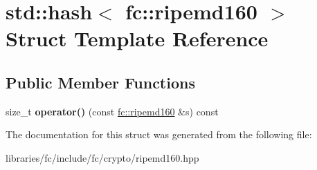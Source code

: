 \hypertarget{structstd_1_1hash_3_01fc_1_1ripemd160_01_4}{}\section{std\+:\+:hash$<$ fc\+:\+:ripemd160 $>$ Struct Template Reference}
\label{structstd_1_1hash_3_01fc_1_1ripemd160_01_4}
\subsection*{Public Member Functions}
\begin{DoxyCompactItemize}
\item 
\mbox{\label{structstd_1_1hash_3_01fc_1_1ripemd160_01_4_acde89667059e1500837a79a0b7c96130}} 
size\+\_\+t {\bfseries operator()} (const \mbox{\hyperlink{classfc_1_1ripemd160}{fc\+::ripemd160}} \&s) const
\end{DoxyCompactItemize}


The documentation for this struct was generated from the following file\+:\begin{DoxyCompactItemize}
\item 
libraries/fc/include/fc/crypto/ripemd160.\+hpp\end{DoxyCompactItemize}
